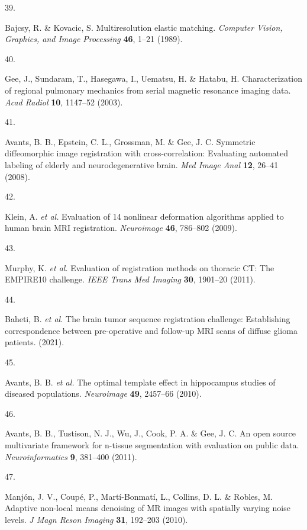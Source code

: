\documentclass[
  12pt,
]{article}
\newlength{\cslhangindent}
\newlength{\csllabelwidth}
\newenvironment{CSLReferences}[2] %
 {%
  \setlength{\parindent}{0pt}
  \ifodd #1 \everypar{\setlength{\hangindent}{\cslhangindent}}\ignorespaces\fi
  \ifnum #2 > 0
  \setlength{\parskip}{#2\baselineskip}
  \fi
 }%
 {}
\newcommand{\CSLLeftMargin}[1]{\parbox[t]{\csllabelwidth}{#1}}
\newcommand{\CSLRightInline}[1]{\parbox[t]{\linewidth - \csllabelwidth}{#1}\break}
\begin{document}
\begin{CSLReferences}{0}{0}
\leavevmode{}%
\CSLLeftMargin{39. }
\CSLRightInline{Bajcsy, R. \& Kovacic, S. Multiresolution elastic
matching. \emph{Computer Vision, Graphics, and Image Processing}
\textbf{46}, 1--21 (1989).}

\leavevmode{}%
\CSLLeftMargin{40. }
\CSLRightInline{Gee, J., Sundaram, T., Hasegawa, I., Uematsu, H. \&
Hatabu, H. Characterization of regional pulmonary mechanics from serial
magnetic resonance imaging data. \emph{Acad Radiol} \textbf{10},
1147--52 (2003).}

\leavevmode{}%
\CSLLeftMargin{41. }
\CSLRightInline{Avants, B. B., Epstein, C. L., Grossman, M. \& Gee, J.
C. Symmetric diffeomorphic image registration with cross-correlation:
Evaluating automated labeling of elderly and neurodegenerative brain.
\emph{Med Image Anal} \textbf{12}, 26--41 (2008).}

\leavevmode{}%
\CSLLeftMargin{42. }
\CSLRightInline{Klein, A. \emph{et al.} Evaluation of 14 nonlinear
deformation algorithms applied to human brain {MRI} registration.
\emph{Neuroimage} \textbf{46}, 786--802 (2009).}

\leavevmode{}%
\CSLLeftMargin{43. }
\CSLRightInline{Murphy, K. \emph{et al.} Evaluation of registration
methods on thoracic {CT}: The {EMPIRE10} challenge. \emph{IEEE Trans Med
Imaging} \textbf{30}, 1901--20 (2011).}

\leavevmode{}%
\CSLLeftMargin{44. }
\CSLRightInline{Baheti, B. \emph{et al.} The brain tumor sequence
registration challenge: Establishing correspondence between
pre-operative and follow-up MRI scans of diffuse glioma patients.
(2021).}

\leavevmode{}%
\CSLLeftMargin{45. }
\CSLRightInline{Avants, B. B. \emph{et al.} The optimal template effect
in hippocampus studies of diseased populations. \emph{Neuroimage}
\textbf{49}, 2457--66 (2010).}

\leavevmode{}%
\CSLLeftMargin{46. }
\CSLRightInline{Avants, B. B., Tustison, N. J., Wu, J., Cook, P. A. \&
Gee, J. C. An open source multivariate framework for n-tissue
segmentation with evaluation on public data. \emph{Neuroinformatics}
\textbf{9}, 381--400 (2011).}

\leavevmode{}%
\CSLLeftMargin{47. }
\CSLRightInline{Manjón, J. V., Coupé, P., Martí-Bonmatí, L., Collins, D.
L. \& Robles, M. Adaptive non-local means denoising of {MR} images with
spatially varying noise levels. \emph{J Magn Reson Imaging} \textbf{31},
192--203 (2010).}


\end{CSLReferences}
\end{document}
